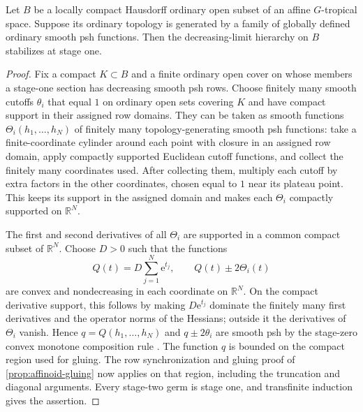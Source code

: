 \documentclass[11pt,a4paper]{amsart}
\begin{document}
\begin{proposition}
\label{prop:positive-coordinate-criterion}
Let $B$ be a locally compact Hausdorff ordinary open subset of an affine $G$-tropical space. Suppose its ordinary topology is generated by a family of globally defined ordinary smooth psh functions. Then the decreasing-limit hierarchy on $B$ stabilizes at stage one.
\end{proposition}

\begin{proof}
Fix a compact $K\subset B$ and a finite ordinary open cover on whose members a stage-one section has decreasing smooth psh rows. Choose finitely many smooth cutoffs $\theta_i$ that equal $1$ on ordinary open sets covering $K$ and have compact support in their assigned row domains. They can be taken as smooth functions $\Theta_i(h_1,\ldots,h_N)$ of finitely many topology-generating smooth psh functions: take a finite-coordinate cylinder around each point with closure in an assigned row domain, apply compactly supported Euclidean cutoff functions, and collect the finitely many coordinates used. After collecting them, multiply each cutoff by extra factors in the other coordinates, chosen equal to $1$ near its plateau point. This keeps its support in the assigned domain and makes each $\Theta_i$ compactly supported on $\mathbb{R}^N$.

The first and second derivatives of all $\Theta_i$ are supported in a common compact subset of $\mathbb{R}^N$. Choose $D>0$ such that the functions
\[
Q(t)=D\sum_{j=1}^N\mathrm{e}^{t_j},\qquad Q(t)\pm2\Theta_i(t)
\]
are convex and nondecreasing in each coordinate on $\mathbb{R}^N$. On the compact derivative support, this follows by making $D\mathrm{e}^{t_j}$ dominate the finitely many first derivatives and the operator norms of the Hessians; outside it the derivatives of $\Theta_i$ vanish. Hence $q=Q(h_1,\ldots,h_N)$ and $q\pm2\theta_i$ are smooth psh by the stage-zero convex monotone composition rule \cite[Proposition~8.2.1]{CLD12}. The function $q$ is bounded on the compact region used for gluing. The row synchronization and gluing proof of \cref{prop:affinoid-gluing} now applies on that region, including the truncation and diagonal arguments. Every stage-two germ is stage one, and transfinite induction gives the assertion.
\end{proof}
\end{document}
